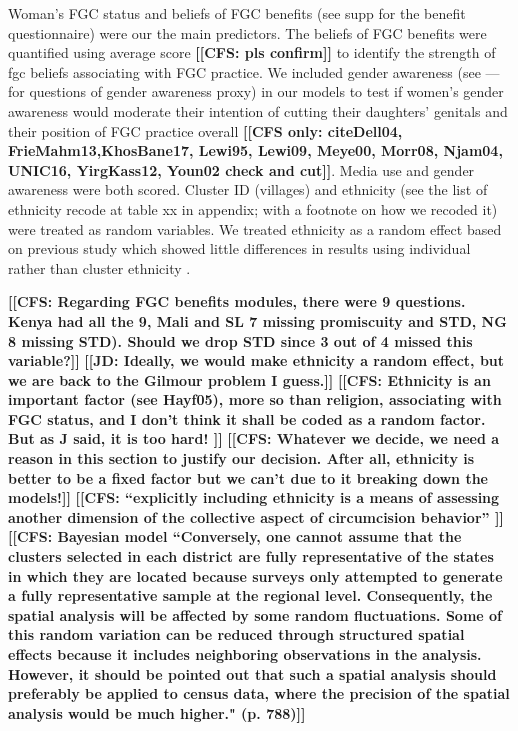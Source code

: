 \documentclass[12pt,]{article}
\newcommand{\comment}[1]{\textbf{[[#1]]}}
\newcommand{\cfcmt}[1]{\comment{CFS: #1}}
\newcommand{\cfonly}[1]{\comment{CFS only: #1}}
\newcommand{\jdcmt}[1]{\comment{JD: #1}}
\begin{document}
Woman's FGC status and beliefs of FGC benefits (see supp for the benefit questionnaire) were our the main predictors.  The beliefs of FGC benefits were quantified using average score \cfcmt{pls confirm} to identify the strength of fgc beliefs associating with FGC practice.  We included gender awareness (see — for questions of gender awareness proxy) in our models to test if women’s gender awareness would moderate  their intention of cutting their daughters’ genitals and their position of FGC practice overall \cfonly{cite{Dell04, FrieMahm13,KhosBane17, Lewi95, Lewi09, Meye00, Morr08, Njam04, UNIC16, YirgKass12, Youn02} check and cut}.  Media use and gender awareness were both scored.  Cluster ID (villages) and ethnicity (see the list of ethnicity recode at table xx in appendix; with a footnote on how we recoded it) were treated as random variables.  We treated ethnicity as a random effect based on previous study which showed little differences in results using individual rather than cluster ethnicity \cite{Hayf05}.

\cfcmt{Regarding FGC benefits modules, there were 9 questions.  Kenya had all the 9, Mali and SL 7 missing promiscuity and STD, NG 8 missing STD).  Should we drop STD since 3 out of 4 missed this variable?}
\jdcmt{Ideally, we would make ethnicity a random effect, but we are back to the Gilmour problem I guess.} \cfcmt{Ethnicity is an important factor (see Hayf05), more so than religion, associating with FGC status, and I don't think it shall be coded as a random factor.  But as J said, it is too hard! } \cfcmt{Whatever we decide, we need a reason in this section to justify our decision. After all, ethnicity is better to be a fixed factor but we can’t due to it breaking down the models!}
\cfcmt{“explicitly including ethnicity is a means of assessing another dimension of the collective aspect of circumcision behavior” \cite{Hayf05}}
\cfcmt{Bayesian model \cite{KandNwak09} “Conversely, one cannot assume that the clusters selected in each district are fully representative of the states in which they are located because surveys only attempted to generate a fully representative sample at the regional level. Consequently, the spatial analysis will be affected by some random fluctuations.  Some of this random variation can be reduced through structured spatial effects because it includes neighboring observations in the analysis. However, it should be pointed out that such a spatial analysis should preferably be applied to census data, where the precision of the spatial analysis would be much higher." (p. 788)}
\end{document}
